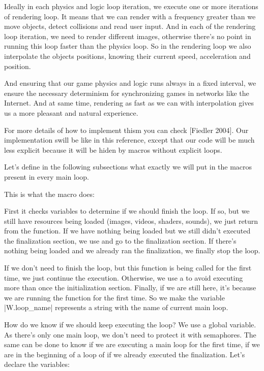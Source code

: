 Ideally in each physics and logic loop iteration, we execute one or
more iterations of rendering loop. It means that we can render with a
frequency greater than we move objects, detect collisions and read
user input. And in each of the rendering loop iteration, we need to
render different images, otherwise there's no point in running this
loop faster than the physics loop. So in the rendering loop we also
interpolate the objects positions, knowing their current speed,
acceleration and position.

And ensuring that our game physics and logic runs always in a fixed
interval, we ensure the necessary determinism for synchronizing games
in networks like the Internet. And at same time, rendering as fast as
we can with interpolation gives us a more pleasant and natural
experience.

For more details of how to implement thism you can check [Fiedler
2004]. Our implementation swill be like in this reference, except that
our code will be much less explicit because it will be hiden by macros
without explicit loops.

Let's define in the following subsections what exactly we will put in
the macros present in every main loop.


This is what the macro  does:

First it checks variables to determine if we should finish the
loop. If so, but we still have resources being loaded (images, videos,
shaders, sounds), we just return from the function. If we have nothing
being loaded but we still didn't executed the finalization section, we
use  and go to the finalization section. If there's
nothing being loaded and we already ran the finalization, we finally
stop the loop.

If we don't need to finish the loop, but this function is being called
for the first time, we just continue the execution. Otherwise, we use
a  to avoid executing more than once the
initialization section. Finally, if we are still here, it's because we
are running the function for the first time. So we make the variable
|W.loop_name| represents a string with the name of current main loop.

How do we know if we should keep executing the loop? We use a global
variable. As there's only one main loop, we don't need to protect it
with semaphores. The same can be done to know if we are executing a
main loop for the first time, if we are in the beginning of a loop of
if we already executed the finalization. Let's declare the variables:

